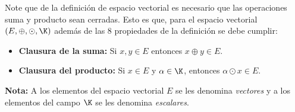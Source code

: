 \documentclass[compacto,10pt]{pubciencias-notas}
\begin{document}

\begin{advertencia}
    Note que de la definición de espacio vectorial es necesario que las operaciones suma y producto sean cerradas. Esto es que, para el espacio vectorial $(E,\oplus,\odot,\K)$ además de las 8 propiedades de la definición se debe cumplir:

    \begin{itemize}[leftmargin=*]
        \item[] \textbf{Clausura de la suma:} Si $x,y\in E$ entonces $x\oplus y\in E$. 
        \item[] \textbf{Clausura del producto:} Si $x\in E$ y $\alpha\in\K$, entonces $\alpha\odot x\in E$.
    \end{itemize}
\end{advertencia}

\textbf{Nota:}
A los elementos del espacio vectorial $E$ se les denomina \emph{vectores} y a los elementos del campo $\K$ se les denomina \emph{escalares}.
\end{document}
